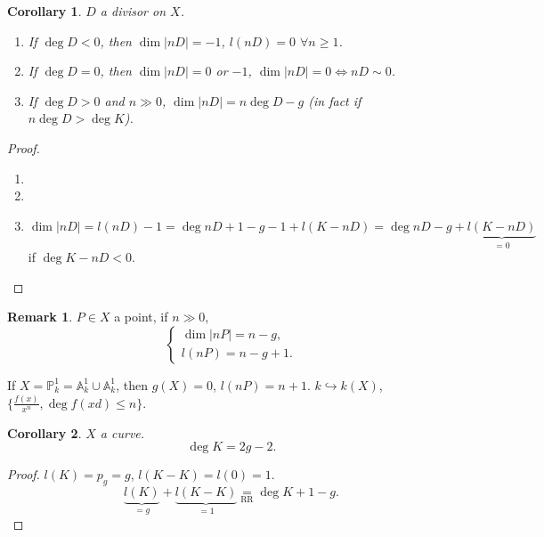 \documentclass[12pt]{article}
\newtheorem*{corollary}{Corollary}
\theoremstyle{definition}
\newtheorem*{remark}{Remark}
\theoremstyle{remark}
\newtheorem*{comment}{Comment}
\begin{document}
\begin{corollary}
$D$ a divisor on $X$.

\begin{enumerate}[label=\arabic*)]
\item If $\deg D<0$, then $\dim|nD|=-1$, $l(nD)=0$ $\forall n\geq1$.

\item If $\deg D=0$, then $\dim|nD|=0$ or $-1$, $\dim|nD|=0\Leftrightarrow nD\sim0$.

\item If $\deg D>0$ and $n\gg0$, $\dim|nD|=n\deg D-g$ (in fact if $n\deg D>\deg K$).
\end{enumerate}
\end{corollary}

\begin{proof}
\begin{enumerate}[label=\arabic*)]
\item \checkmark

\item \checkmark

\item
\[\dim|nD|=l(nD)-1=\deg nD+1-g-1+l(K-nD)=\deg nD-g+\underbrace{l(K-nD)}_{=0}\]
if $\deg K-nD<0$.
\end{enumerate}
\end{proof}

\begin{remark}
$P\in X$ a point, if $n\gg0$,
\[\left\{\begin{array}{l}\dim|nP|=n-g,\\l(nP)=n-g+1.\end{array}\right.\]
\end{remark}

If $X=\mathbb{P}_k^1=\mathbb{A}_k^1\cup\mathbb{A}_k^1$, then $g(X)=0$, $l(nP)=n+1$. $k\hookrightarrow k(X)$, $\{\frac{f(x)}{x^n},\deg f(xd)\leq n\}$.

\begin{comment}
The genus does not depend on the particular choice of the point. Riemann-Roch theorem tells that there are less regular functions than we could expect: not in all curves there are functions with each number of poles.
\end{comment}

\begin{corollary}
$X$ a curve.
\[\deg K=2g-2.\]
\end{corollary}

\begin{proof}
$l(K)=p_g=g$, $l(K-K)=l(0)=1$.
\[\underbrace{l(K)}_{=g}+\underbrace{l(K-K)}_{=1}\underset{\text{RR}}{=}\deg K+1-g.\]
\end{proof}
\end{document}
